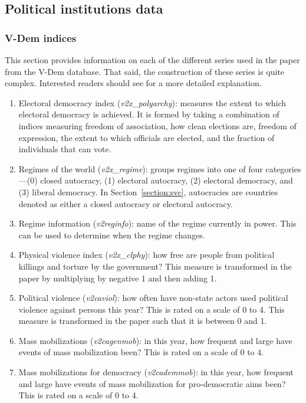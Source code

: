 \subsection{Political institutions data}

\subsubsection{V-Dem indices}\label{section:vdem_ind}

This section provides information on each of the different series used in the paper from the V-Dem database. That said, the construction of these series is quite complex. Interested readers should see \cite{Coppedge2018} for a more detailed explanation.

\begin{enumerate}
	\item Electoral democracy index (\textit{v2x\_polyarchy}): measures the extent to which electoral democracy is achieved. It is formed by taking a combination of indices measuring freedom of association, how clean elections are, freedom of expression, the extent to which officials are elected, and
the fraction of individuals that can vote.
	\item Regimes of the world (\textit{v2x\_regime}): groups regimes into one of four categories---(0) closed autocracy, (1) electoral autocracy, (2) electoral democracy,  and (3) liberal democracy. In Section~\ref{section:svc}, autocracies are countries denoted as either a closed autocracy or electoral autocracy.
	\item Regime information (\textit{v2reginfo}): name of the regime currently in power. This can be used to determine when the regime changes.
	\item Physical violence index (\textit{v2x\_clphy}): how free are people from political killings and torture by the government? This measure is transformed in the paper by multiplying by negative 1 and then adding 1.
	\item Political violence (\textit{v2caviol}): how often have non-state actors used political violence against persons this year? This is rated on a scale of 0 to 4. This measure is transformed in the paper such that it is between 0 and 1.
	\item Mass mobilizations (\textit{v2cagenmob}): in this year, how frequent and large have events of mass mobilization been?  This is rated on a scale of 0 to 4.
	\item Mass mobilizations for democracy (\textit{v2cademmob}): in this year, how frequent and large have events of mass mobilization for pro-democratic aims been?  This is rated on a scale of 0 to 4.

\end{enumerate}
